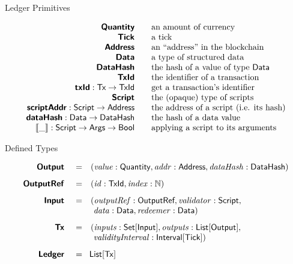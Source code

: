 \newcommand\bs[1]{\mbox{\textbf{\s{#1}}}}
\begin{frame}{Ledger Primitives}

\begin{displaymath}
\begin{array}{rll}
  \bs{Quantity} && \mbox{an amount of currency}\\
  \bs{Tick}  && \mbox{a tick}\\
  \bs{Address} && \mbox{an ``address'' in the blockchain}\\
  \bs{Data}  && \mbox{a type of structured data}\\
  \bs{DataHash} && \mbox{the hash of a value of type \Data{}}\\
  \bs{TxId} && \mbox{the identifier of a transaction}\\
  \bs{txId} : \s{Tx} \rightarrow \s{TxId} && \mbox{get a transaction's identifier}\\
  \bs{Script} && \mbox{the (opaque) type of scripts}\\
  \bs{scriptAddr} : \s{Script} \rightarrow \s{Address} && \mbox{the address of a script (i.e. its hash)}\\
  \bs{dataHash} : \s{Data} \rightarrow \s{DataHash} && \mbox{the hash of a data value}\\
  \mathbf{\llbracket \_ \rrbracket} : \script \rightarrow \s{Args} \rightarrow \s{Bool} && \mbox{applying a script to its arguments}\\
\end{array}
\end{displaymath}

\end{frame}

\begin{frame}{Defined Types}

\begin{displaymath}
\begin{array}{rll}
  \bs{Output }    &=&(\val: \qty, \addr: \Address, \dataHsh: \DataHash)\\[8pt]

  \bs{OutputRef } &=&(\txrefid: \TxId, \idx: \N)\\[8pt]

  \bs{Input }     &=&(\outputref: \s{OutputRef}, \validator: \script,\\
                  & &\ \dataVal: \Data, \redeemerVal: \Data)\\[8pt]

  \bs{Tx }        &=&(\inputs: \Set{\s{Input}}, \outputs: \List{\s{Output}},\\
                  & &\ \validityInterval: \Interval{\tick})\\[8pt]

  \bs{Ledger }    &=&\!\List{\eutxotx}\\
\end{array}
\end{displaymath}

\end{frame}


